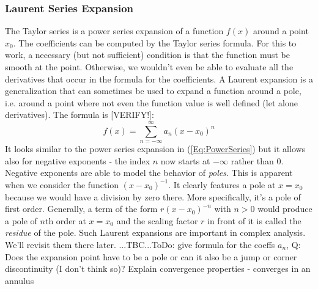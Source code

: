 \subsubsection{Laurent Series Expansion}
The Taylor series is a power series expansion of a function $f(x)$ around a point $x_0$. The coefficients can be computed by the Taylor series formula. For this to work, a necessary (but not sufficient) condition is that the function must be smooth at the point. Otherwise, we wouldn't even be able to evaluate all the derivatives that occur in the formula for the coefficients. A Laurent expansion is a generalization that can sometimes be used to expand a function around a pole, i.e. around a point where not even the function value is well defined (let alone derivatives). The formula is [VERIFY!]:
\begin{equation}
\label{Eq:LaurentSeries}
f(x) = \sum_{n=-\infty}^\infty a_n  (x-x_0)^n
\end{equation}
It looks similar to the power series expansion in (\ref{Eq:PowerSeries}) but it allows also for negative exponents - the index $n$ now starts at $-\infty$ rather than $0$. Negative exponents are able to model the behavior of \emph{poles}. This is apparent when we consider the function $(x-x_0)^{-1}$. It clearly features a pole at $x = x_0$ because we would have a division by zero there. More specifically, it's a pole of first order. Generally, a term of the form $r (x-x_0)^{-n}$ with $n > 0$ would produce a pole of $n$th order at $x = x_0$ and the scaling factor $r$ in front of it is called the \emph{residue} of the pole. Such Laurent expansions are important in complex analysis. We'll revisit them there later. ...TBC...ToDo: give formula for the coeffs $a_n$, Q: Does the expansion point have to be a pole or can it also be a jump or corner discontinuity (I don't think so)? Explain convergence properties - converges in an annulus






